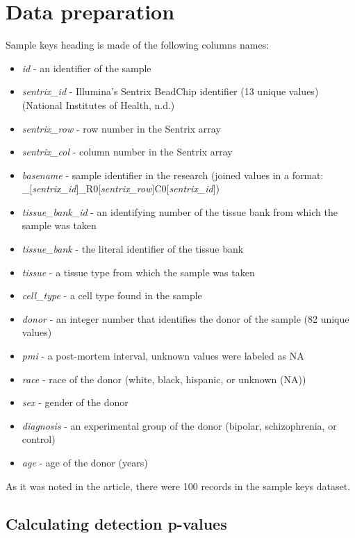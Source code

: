 \documentclass[
]{article}
\providecommand{\tightlist}{%
  \setlength{\itemsep}{0pt}\setlength{\parskip}{0pt}}
\begin{document}
\hypertarget{data-preparation}{%
\section{Data preparation}\label{data-preparation}}

Sample keys heading is made of the following columns names:

\begin{itemize}
\tightlist
\item
  \emph{id} - an identifier of the sample
\item
  \emph{sentrix\_id} - Illumina's Sentrix BeadChip identifier (13 unique
  values) (National Institutes of Health, n.d.)
\item
  \emph{sentrix\_row} - row number in the Sentrix array
\item
  \emph{sentrix\_col} - column number in the Sentrix array
\item
  \emph{basename} - sample identifier in the research (joined values in
  a format:
  \newline [\textit{id}]\_{[}\emph{sentrix\_id}{]}\_R0{[}\emph{sentrix\_row}{]}C0{[}\emph{sentrix\_id}{]})
\item
  \emph{tissue\_bank\_id} - an identifying number of the tissue bank
  from which the sample was taken
\item
  \emph{tissue\_bank} - the literal identifier of the tissue bank
\item
  \emph{tissue} - a tissue type from which the sample was taken
\item
  \emph{cell\_type} - a cell type found in the sample
\item
  \emph{donor} - an integer number that identifies the donor of the
  sample (82 unique values)
\item
  \emph{pmi} - a post-mortem interval, unknown values were labeled as NA
\item
  \emph{race} - race of the donor (white, black, hispanic, or unknown
  (NA))
\item
  \emph{sex} - gender of the donor
\item
  \emph{diagnosis} - an experimental group of the donor (bipolar,
  schizophrenia, or control)
\item
  \emph{age} - age of the donor (years)
\end{itemize}

As it was noted in the article, there were 100 records in the sample
keys dataset.

\hypertarget{calculating-detection-p-values}{%
\subsection{Calculating detection
p-values}\label{calculating-detection-p-values}}
\end{document}

